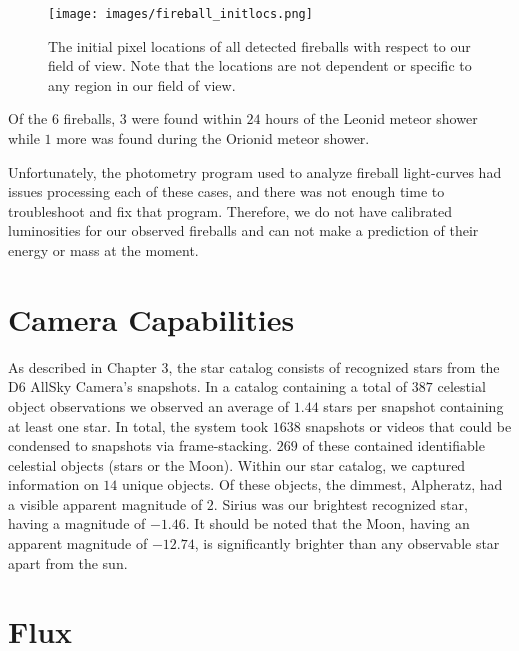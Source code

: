 \begin{figure}[ht!]
  \centering
  \texttt{[image: images/fireball\_initlocs.png]}
  \caption[The initial pixel locations of all detected fireballs with respect to our field of view.]{The initial pixel locations of all detected fireballs with respect to our field of view.  Note that the locations are not dependent or specific to any region in our field of view.}
  \label{fireball_locs}
\end{figure}

Of the $6$ fireballs, $3$ were found within $24$ hours of the Leonid meteor shower while $1$ more was found during the Orionid meteor shower.  

Unfortunately, the photometry program used to analyze fireball light-curves had issues processing each of these cases, and there was not enough time to troubleshoot and fix that program.  
Therefore, we do not have calibrated luminosities for our observed fireballs and can not make a prediction of their energy or mass at the moment. 


\section{Camera Capabilities}

As described in Chapter 3, the star catalog consists of recognized stars from the D6 AllSky Camera's snapshots.
In a catalog containing a total of $387$ celestial object observations we observed an average of $1.44$ stars per snapshot containing at least one star.
In total, the system took $1638$ snapshots or videos that could be condensed to snapshots via frame-stacking.
$269$ of these contained identifiable celestial objects (stars or the Moon).  
Within our star catalog, we captured information on $14$ unique objects.
Of these objects, the dimmest, Alpheratz, had a visible apparent magnitude of $2$. 
Sirius was our brightest recognized star, having a magnitude of $-1.46$.
It should be noted that the Moon, having an apparent magnitude of $-12.74$, is significantly brighter than any observable star apart from the sun.


\section{Flux}

